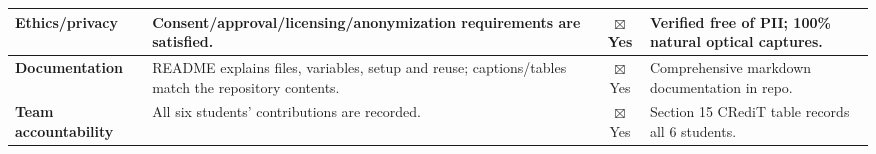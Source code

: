 \documentclass[11pt,a4paper]{article}
\begin{document}
\begin{tabularx}{\textwidth}{|p{2.8cm}|X|c|p{3.4cm}|}
\textbf{Ethics/privacy} & Consent/approval/licensing/anonymization requirements are satisfied. & $\boxtimes$ Yes & Verified free of PII; 100\% natural optical captures. \\ \hline
\textbf{Documentation} & README explains files, variables, setup and reuse; captions/tables match the repository contents. & $\boxtimes$ Yes & Comprehensive markdown documentation in repo. \\ \hline
\textbf{Team accountability} & All six students' contributions are recorded. & $\boxtimes$ Yes & Section 15 CRediT table records all 6 students. \\ \hline
\end{tabularx}
\normalsize
\end{document}
